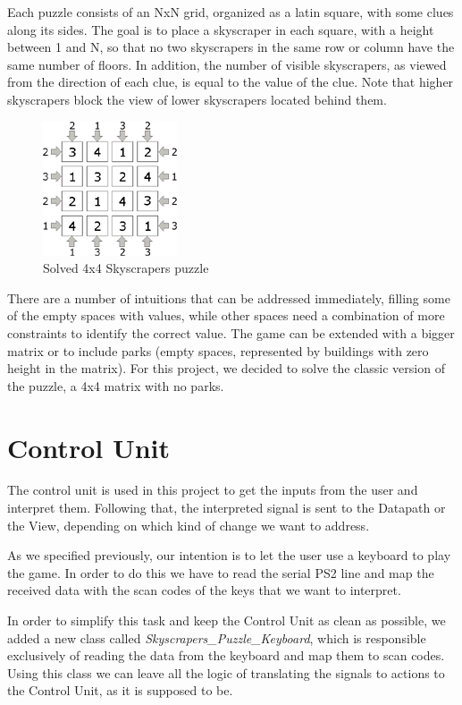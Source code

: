 \documentclass[12pt]{report}
\begin{document}
Each puzzle consists of an NxN grid, organized as a latin square, with some
clues along its sides. The goal is to place a skyscraper in each square,
with a height between 1 and N, so that no two skyscrapers in the same row
or column have the same number of floors. In addition, the number of visible
skyscrapers, as viewed from the direction of each clue, is equal to the value
of the clue. Note that higher skyscrapers block the view of lower skyscrapers
located behind them.

\begin{figure}[H]
  \centering
  \includegraphics[keepaspectratio]{images/skyscrapers_small_solved.jpg}
  \caption{Solved 4x4 Skyscrapers puzzle}
\end{figure}

There are a number of intuitions that can be addressed immediately,
filling some of the empty spaces with values, while other spaces need
a combination of more constraints to identify the correct value. The game
can be extended with a bigger matrix or to include parks (empty spaces,
represented by buildings with zero height in the matrix). For this project, we
decided to solve the classic version of the puzzle, a 4x4 matrix with no parks.

\newpage

\section*{Control Unit}

The control unit is used in this project to get the inputs from the user
and interpret them. Following that, the interpreted signal is sent to
the Datapath or the View, depending on which kind of change we want to
address.

As we specified previously, our intention is to let the user use
a keyboard to play the game. In order to do this we have to read the
serial PS2 line and map the received data with the scan codes of the
keys that we want to interpret.

In order to simplify this task and keep the Control Unit as clean as possible,
we added a new class called \textit{Skyscrapers\_Puzzle\_Keyboard}, which is
responsible exclusively of reading the data from the keyboard and map them to
scan codes. Using this class we can leave all the logic of translating
the signals to actions to the Control Unit, as it is supposed to be.
\end{document}
